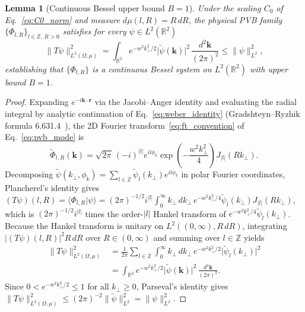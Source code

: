 \documentclass[aps,pra,onecolumn,notitlepage,11pt,tightenlines,amsmath,amssymb,floatfix,longbibliography]{revtex4-2}
\providecommand{\braket}[2]{\langle#1\vert#2\rangle}
\providecommand{\abs}[1]{\lvert#1\rvert}
\providecommand{\norm}[1]{\lVert#1\rVert}
\newtheorem{lemma}{Lemma}
\begin{document}
\begin{lemma}[Continuous Bessel upper bound $B=1$]
\label{lem:bessel_upper}
Under the scaling $C_0$ of Eq.~\eqref{eq:C0_norm} and measure $d\mu(l,R) = R\,dR$, the physical PVB family $\{\Phi_{l,R}\}_{l\in\mathbb{Z},\,R>0}$ satisfies for every $\psi \in L^2(\mathbb{R}^2)$
\begin{equation}
\norm{T\psi}_{L^2(\Omega,\mu)}^2 = \int_{\mathbb{R}^2} e^{-w^2 k_\perp^2/2}\abs{\widetilde{\psi}(\mathbf{k})}^2\,\frac{d^2\mathbf{k}}{(2\pi)^2} \le \norm{\psi}_{L^2}^2,
\label{eq:bessel_lemma}
\end{equation}
establishing that $\{\Phi_{l,R}\}$ is a continuous Bessel system on $L^2(\mathbb{R}^2)$ with upper bound $B = 1$.
\end{lemma}
\begin{proof}
Expanding $e^{-i\mathbf{k}\cdot\mathbf{r}}$ via the Jacobi--Anger identity and evaluating the radial integral by analytic continuation of Eq.~\eqref{eq:weber_identity} (Gradshteyn--Ryzhik formula 6.631.4~\cite{Gradshteyn2014}), the 2D Fourier transform~\eqref{eq:ft_convention} of Eq.~\eqref{eq:pvb_mode} is
\begin{equation}
\widetilde{\Phi}_{l,R}(\mathbf{k}) = \sqrt{2\pi}\,(-i)^{\abs{l}} e^{il\phi_k} \exp\!\left(-\frac{w^2 k_\perp^2}{4}\right) J_{\abs{l}}(R k_\perp).
\label{eq:pvb_ft}
\end{equation}
Decomposing $\widetilde{\psi}(k_\perp,\phi_k) = \sum_{l\in\mathbb{Z}} \widetilde{\psi}_l(k_\perp)e^{il\phi_k}$ in polar Fourier coordinates, Plancherel's identity gives $(T\psi)(l,R) = \braket{\Phi_{l,R}}{\psi} = (2\pi)^{-1/2} i^{\abs{l}} \allowbreak \int_0^\infty k_\perp\,dk_\perp\, \allowbreak e^{-w^2 k_\perp^2/4}\widetilde{\psi}_l(k_\perp) J_{\abs{l}}(Rk_\perp)$, which is $(2\pi)^{-1/2} i^{\abs{l}}$ times the order-$\abs{l}$ Hankel transform of $e^{-w^2 k_\perp^2/4}\widetilde{\psi}_l(k_\perp)$. Because the Hankel transform is unitary on $L^2((0,\infty), R\,dR)$, integrating $\abs{(T\psi)(l,R)}^2 R\,dR$ over $R \in (0,\infty)$ and summing over $l \in \mathbb{Z}$ yields
\begin{align*}
\norm{T\psi}_{L^2(\Omega,\mu)}^2 &= \frac{1}{2\pi}\sum_{l\in\mathbb{Z}} \int_0^\infty k_\perp\,dk_\perp\,e^{-w^2 k_\perp^2/2}\abs{\widetilde{\psi}_l(k_\perp)}^2 \\
&= \int_{\mathbb{R}^2} e^{-w^2 k_\perp^2/2}\abs{\widetilde{\psi}(\mathbf{k})}^2\,\frac{d^2\mathbf{k}}{(2\pi)^2}.
\end{align*}
Since $0 < e^{-w^2 k_\perp^2/2} \le 1$ for all $k_\perp \ge 0$, Parseval's identity gives $\norm{T\psi}_{L^2(\Omega,\mu)}^2 \le (2\pi)^{-2}\norm{\widetilde{\psi}}_{L^2}^2 = \norm{\psi}_{L^2}^2$.
\end{proof}
\end{document}
